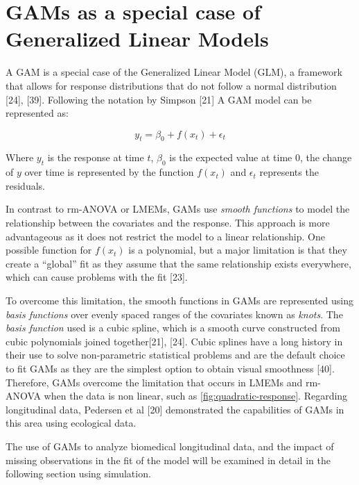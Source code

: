 \documentclass[
]{article}
\begin{document}
\hypertarget{gams-as-a-special-case-of-generalized-linear-models}{%
\section{GAMs as a special case of Generalized Linear Models}\label{gams-as-a-special-case-of-generalized-linear-models}}

A GAM is a special case of the Generalized Linear Model (GLM), a framework that allows for response distributions that do not follow a normal distribution {[}24{]}, {[}39{]}. Following the notation by Simpson {[}21{]} A GAM model can be represented as:

\begin{equation}
  y_{t}=\beta_0+f(x_t)+\epsilon_t  
  \label{eq:GAM}
\end{equation}

Where \(y_t\) is the response at time \(t\), \(\beta_0\) is the expected value at time 0, the change of \(y\) over time is represented by the function \(f(x_t)\) and \(\epsilon_t\) represents the residuals.

In contrast to rm-ANOVA or LMEMs, GAMs use \emph{smooth functions} to model the relationship between the covariates and the response. This approach is more advantageous as it does not restrict the model to a linear relationship. One possible function for \(f(x_t)\) is a polynomial, but a major limitation is that they create a ``global'' fit as they assume that the same relationship exists everywhere, which can cause problems with the fit {[}23{]}.

To overcome this limitation, the smooth functions in GAMs are represented using \emph{basis functions} over evenly spaced ranges of the covariates known as \emph{knots}. The \emph{basis function} used is a cubic spline, which is a smooth curve constructed from cubic polynomials joined together{[}21{]}, {[}24{]}. Cubic splines have a long history in their use to solve non-parametric statistical problems and are the default choice to fit GAMs as they are the simplest option to obtain visual smoothness {[}40{]}. Therefore, GAMs overcome the limitation that occurs in LMEMs and rm-ANOVA when the data is non linear, such as \ref{fig:quadratic-response}. Regarding longitudinal data, Pedersen et al {[}20{]} demonstrated the capabilities of GAMs in this area using ecological data.

The use of GAMs to analyze biomedical longitudinal data, and the impact of missing observations in the fit of the model will be examined in detail in the following section using simulation.
\end{document}
